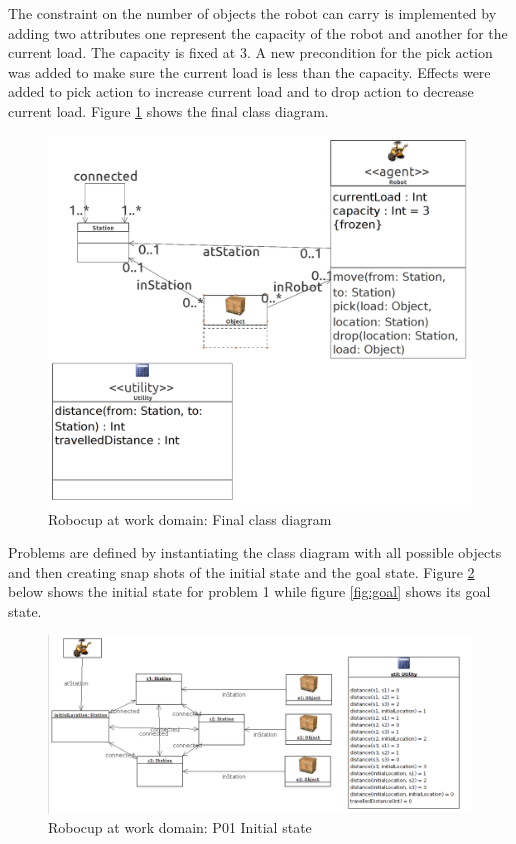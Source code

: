 \documentclass{article}
\begin{document}
The constraint on the number of objects the robot can carry is implemented by adding two attributes one represent the capacity of the robot and another for the current load. The capacity is fixed at 3. A new precondition for the pick action was added to make sure the current load is less than the capacity. Effects were added to pick action to increase current load and to drop action to decrease current load. Figure \ref{fig:class} shows the final class diagram.

\begin{figure}[H] %
	\centering
	\includegraphics[width=12 cm]{figures/class_diagram.png} 
	\caption{Robocup at work domain: Final class diagram}
	\label{fig:class}
\end{figure}

Problems are defined by instantiating the class diagram with all possible objects and then creating snap shots of the initial state and the goal state. Figure \ref{fig:initial} below shows the initial state for problem 1 while figure \ref{fig:goal} shows its goal state.

\begin{figure}[H] %
	\centering
	\includegraphics[width=15 cm]{figures/p01_initial_state.png} 
	\caption{Robocup at work domain: P01 Initial state}
	\label{fig:initial}
\end{figure}
\end{document}
